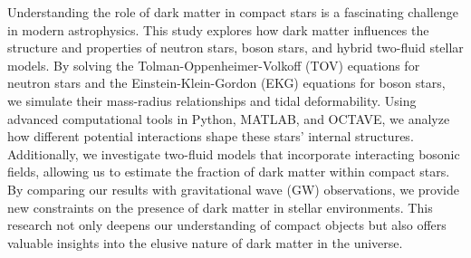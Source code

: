 Understanding the role of dark matter in compact stars is a fascinating challenge in modern astrophysics. This study explores how dark matter influences the structure and properties of neutron stars, boson stars, and hybrid two-fluid stellar models. By solving the Tolman-Oppenheimer-Volkoff (TOV) equations for neutron stars and the Einstein-Klein-Gordon (EKG) equations for boson stars, we simulate their mass-radius relationships and tidal deformability. Using advanced computational tools in Python, MATLAB, and OCTAVE, we analyze how different potential interactions shape these stars' internal structures. Additionally, we investigate two-fluid models that incorporate interacting bosonic fields, allowing us to estimate the fraction of dark matter within compact stars. By comparing our results with gravitational wave (GW) observations, we provide new constraints on the presence of dark matter in stellar environments. This research not only deepens our understanding of compact objects but also offers valuable insights into the elusive nature of dark matter in the universe.